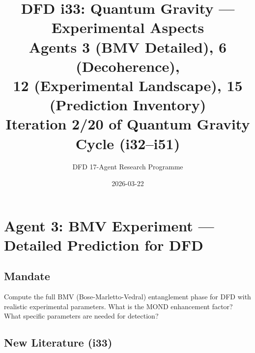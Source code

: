 \documentclass[11pt,a4paper]{article}
\title{DFD i33: Quantum Gravity --- Experimental Aspects\\[6pt]
\large Agents 3 (BMV Detailed), 6 (Decoherence),\\
12 (Experimental Landscape), 15 (Prediction Inventory)\\[6pt]
\normalsize Iteration 2/20 of Quantum Gravity Cycle (i32--i51)}
\author{DFD 17-Agent Research Programme}
\date{2026-03-22}
\begin{document}
\maketitle
\tableofcontents
\newpage

\section{Agent 3: BMV Experiment --- Detailed Prediction for DFD}
\label{sec:agent3}

\subsection{Mandate}

Compute the full BMV (Bose-Marletto-Vedral) entanglement phase for DFD with realistic experimental parameters. What is the MOND enhancement factor? What specific parameters are needed for detection?

\subsection{New Literature (i33)}
\end{document}
